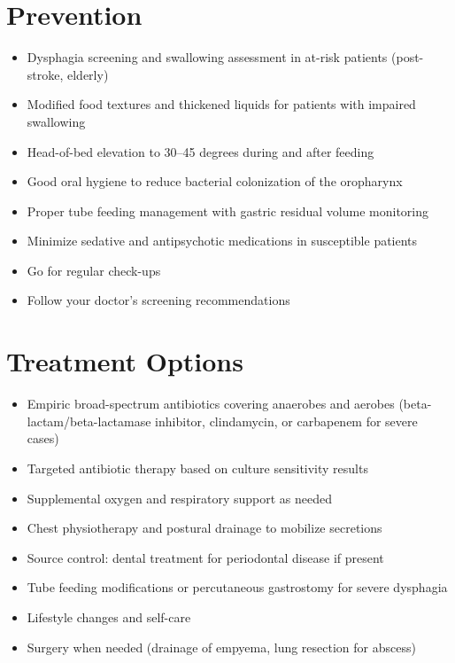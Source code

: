 \section{Prevention}

\begin{itemize}[noitemsep]
  \item Dysphagia screening and swallowing assessment in at-risk patients (post-stroke, elderly)
  \item Modified food textures and thickened liquids for patients with impaired swallowing
  \item Head-of-bed elevation to 30--45 degrees during and after feeding
  \item Good oral hygiene to reduce bacterial colonization of the oropharynx
  \item Proper tube feeding management with gastric residual volume monitoring
  \item Minimize sedative and antipsychotic medications in susceptible patients
  \item Go for regular check-ups
  \item Follow your doctor's screening recommendations
\end{itemize}

\section{Treatment Options}

\begin{itemize}[noitemsep]
  \item Empiric broad-spectrum antibiotics covering anaerobes and aerobes (beta-lactam/beta-lactamase inhibitor, clindamycin, or carbapenem for severe cases)
  \item Targeted antibiotic therapy based on culture sensitivity results
  \item Supplemental oxygen and respiratory support as needed
  \item Chest physiotherapy and postural drainage to mobilize secretions
  \item Source control: dental treatment for periodontal disease if present
  \item Tube feeding modifications or percutaneous gastrostomy for severe dysphagia
  \item Lifestyle changes and self-care
  \item Surgery when needed (drainage of empyema, lung resection for abscess)
\end{itemize}


